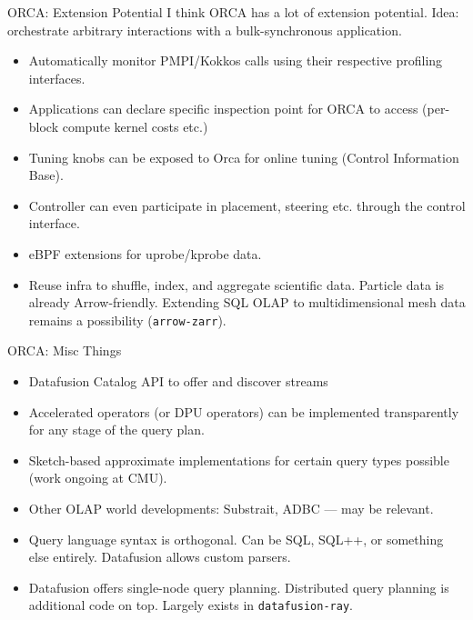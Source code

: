 \documentclass{beamer}
\begin{document}
\begin{frame}{ORCA: Extension Potential}
  I think ORCA has a lot of extension potential. Idea: orchestrate arbitrary interactions with a bulk-synchronous application.

  \begin{itemize}
    \item Automatically monitor PMPI/Kokkos calls using their respective profiling interfaces.
    \item Applications can declare specific inspection point for ORCA to access (per-block compute kernel costs etc.)
    \item Tuning knobs can be exposed to Orca for online tuning (Control Information Base).
    \item Controller can even participate in placement, steering etc. through the control interface.
    \item eBPF extensions for uprobe/kprobe data.
    \item Reuse infra to shuffle, index, and aggregate scientific data. Particle data is already Arrow-friendly. Extending SQL OLAP to multidimensional mesh data remains a possibility (\texttt{arrow-zarr}).
  \end{itemize}
\end{frame}

\begin{frame}{ORCA: Misc Things}
  \begin{itemize}
    \item Datafusion Catalog API to offer and discover streams
    \item Accelerated operators (or DPU operators) can be implemented transparently for any stage of the query plan.
    \item Sketch-based approximate implementations for certain query types possible (work ongoing at CMU).
    \item Other OLAP world developments: Substrait, ADBC --- may be relevant.
    \item Query language syntax is orthogonal. Can be SQL, SQL++, or something else entirely. Datafusion allows custom parsers.
    \item Datafusion offers single-node query planning. Distributed query planning is additional code on top. Largely exists in \texttt{datafusion-ray}.
  \end{itemize}
\end{frame}
\end{document}
